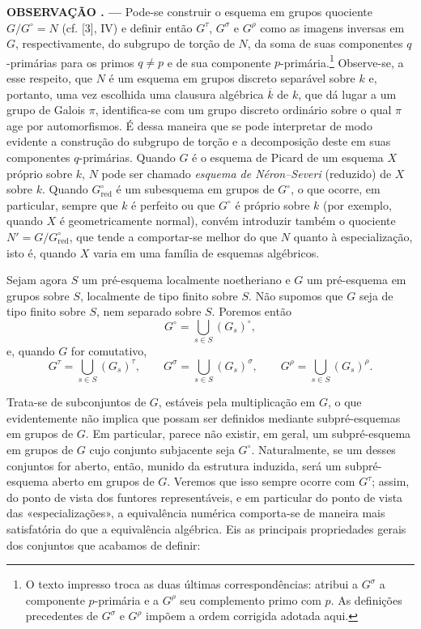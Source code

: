 \documentclass[11pt,twoside,openany]{book}
\numberwithin{equation}{section}
\newcommand{\src}[1]{%
  \phantomsection\hypertarget{src:#1}{}%
  \marginpar{\raggedleft\footnotesize\sffamily #1}%
}
\theoremstyle{plain}
\theoremstyle{definition}
\theoremstyle{remark}
\newcommand{\result}[2]{%
  \par\medskip\noindent\textbf{#1%
  \if\relax\detokenize{#2}\relax\else\space#2\fi. ---}\enspace
}
\newcommand{\FgaUnitKey}{frontmatter}
\renewcommand{\src}[1]{%
  \phantomsection\hypertarget{src:\FgaUnitKey:#1}{}%
  \marginpar{\raggedleft\footnotesize\sffamily #1}%
}
\begin{document}
\result{OBSERVAÇÃO}{} Pode-se construir o esquema em grupos quociente
$G/G^\circ=N$ (cf. [3], IV) e definir então $G^\tau$, $G^\sigma$ e
$G^\rho$ como as imagens inversas em $G$, respectivamente, do subgrupo de
torção de $N$, da soma de suas componentes $q$-primárias para os primos
$q\neq p$ e de sua componente $p$-primária.\footnote{O texto impresso troca
as duas últimas correspondências: atribui a $G^\sigma$ a componente
$p$-primária e a $G^\rho$ seu complemento primo com $p$. As definições
precedentes de $G^\sigma$ e $G^\rho$ impõem a ordem corrigida adotada aqui.}
Observe-se, a esse respeito, que $N$ é um esquema em grupos discreto separável
sobre $k$ e, portanto, uma vez escolhida uma clausura algébrica $\overline k$
de $k$, que dá lugar a um grupo de Galois $\pi$, identifica-se com um grupo
discreto ordinário sobre o qual $\pi$ age por automorfismos. É dessa maneira
que se pode interpretar de modo evidente a construção do subgrupo de torção e
a decomposição deste em suas componentes $q$-primárias. Quando $G$ é o esquema
de Picard de um esquema $X$ próprio sobre $k$, $N$ pode ser chamado
\emph{esquema de Néron--Severi} (reduzido) de $X$ sobre $k$. Quando
$G^\circ_{\mathrm{red}}$ é um subesquema em grupos de $G^\circ$, o que
ocorre, em particular, sempre que $k$ é perfeito ou que $G^\circ$ é próprio
sobre $k$ (por exemplo, quando $X$ é geometricamente normal), convém introduzir
também o quociente $N'=G/G^\circ_{\mathrm{red}}$, que tende a comportar-se
melhor do que $N$ quanto à especialização, isto é, quando $X$ varia em uma
família de esquemas algébricos.

Sejam agora $S$ um pré-esquema localmente noetheriano e $G$ um pré-esquema em
grupos sobre $S$, localmente de tipo finito sobre $S$. Não supomos que $G$ seja
de tipo finito sobre $S$, nem separado sobre $S$. Poremos então
\[
G^\circ=\bigcup_{s\in S}(G_s)^\circ,
\]
e, quando $G$ for comutativo,
\[
G^\tau=\bigcup_{s\in S}(G_s)^\tau,
\qquad
G^\sigma=\bigcup_{s\in S}(G_s)^\sigma,
\qquad
G^\rho=\bigcup_{s\in S}(G_s)^\rho.
\]
\src{224}
Trata-se de subconjuntos de $G$, estáveis pela multiplicação em $G$, o que
evidentemente não implica que possam ser definidos mediante subpré-esquemas em
grupos de $G$. Em particular, parece não existir, em geral, um subpré-esquema
em grupos de $G$ cujo conjunto subjacente seja $G^\circ$. Naturalmente, se um
desses conjuntos for aberto, então, munido da estrutura induzida, será um
subpré-esquema aberto em grupos de $G$. Veremos que isso sempre ocorre com
$G^\tau$; assim, do ponto de vista dos funtores representáveis, e em particular
do ponto de vista das «especializações», a equivalência numérica comporta-se
de maneira mais satisfatória do que a equivalência algébrica. Eis as principais
propriedades gerais dos conjuntos que acabamos de definir:
\end{document}
